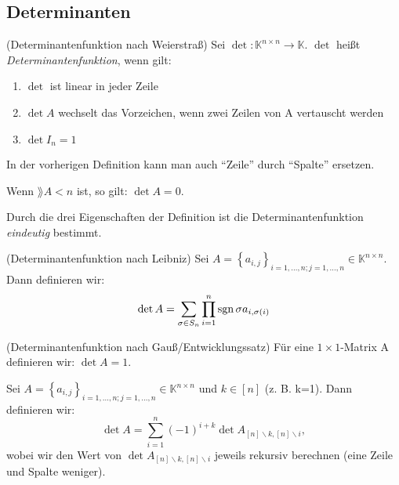 \documentclass[10pt]{scrbook}
\begin{document}
\subsection{Determinanten}

\begin{Def} (Determinantenfunktion nach Weierstraß)
Sei $\det: \mathbb{K}^{n\times n}\rightarrow \mathbb{K}$. $\det$ heißt \emph{Determinantenfunktion}, wenn gilt:
\begin{enumerate}
	\item $\det$ ist linear in jeder Zeile
	\item $\det A$ wechselt das Vorzeichen, wenn zwei Zeilen von A vertauscht werden
	\item $\det I_n=1$
\end{enumerate}
\end{Def}

\begin{Bem}
In der vorherigen Definition kann man auch "`Zeile"' durch "`Spalte"' ersetzen.
\end{Bem}

\begin{Le}
Wenn $\rang A<n$ ist, so gilt: $\det A=0$.
\end{Le}

\begin{Sa}
Durch die drei Eigenschaften der Definition ist die Determinantenfunktion \emph{eindeutig} bestimmt.
\end{Sa}

\begin{Def} (Determinantenfunktion nach Leibniz)
Sei $A=\left\{a_{i, j}\right\}_{i=1, \ldots, n; j=1, \ldots, n}\in \mathbb{K}^{n\times n}$. Dann definieren wir:
\begin{equation}
	\det A=\sum_{\sigma \in S_n} \prod_{i=1}^n \operatorname{sgn} \sigma a_{i, \sigma(i)}
\end{equation}
\end{Def}

\begin{Def} (Determinantenfunktion nach Gauß/Entwicklungssatz)
Für eine $1\times 1$-Matrix A definieren wir: $\det A=1$.

Sei $A=\left\{a_{i, j}\right\}_{i=1, \ldots, n; j=1, \ldots, n}\in \mathbb{K}^{n\times n}$ und $k\in[n]$ (z. B. k=1). Dann definieren wir:
\begin{equation}
\det A=\sum_{i=1}^n (-1)^{i+k} \det A_{[n]\backslash k, [n]\backslash i},
\end{equation}
wobei wir den Wert von $\det A_{[n]\backslash k, [n]\backslash i}$ jeweils rekursiv berechnen (eine Zeile und Spalte weniger).
\end{Def}
\end{document}
